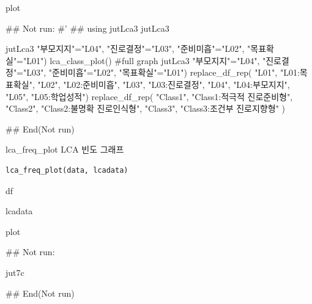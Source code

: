 \documentclass[a4paper]{book}
\begin{document}
%
\begin{Value}
plot
\end{Value}
%
\begin{Examples}
\begin{ExampleCode}
\#\# Not run: 
#'
## using
jutLca3 %
jutLca3 %

jutLca3 %
                         "부모지지"="L04",
                         "진로결정"="L03",
                         "준비미흡"="L02",
                         "목표확실"="L01") %
  lca_class_plot()
#full graph
jutLca3 %
                         "부모지지"="L04",
                         "진로결정"="L03",
                         "준비미흡"="L02",
                         "목표확실"="L01") %
  replace_df_rep(
    "L01", "L01:목표확실",
    "L02", "L02:준비미흡",
    "L03", "L03:진로결정",
    "L04", "L04:부모지지",
    "L05", "L05:학업성적")%
  replace_df_rep(
    "Class1", "Class1:적극적 진로준비형",
    "Class2", "Class2:불명확 진로인식형",
    "Class3", "Class3:조건부 진로지향형"
  )%


## End(Not run)
\end{ExampleCode}
\end{Examples}
%
\begin{Description}
lca\_freq\_plot LCA 빈도 그래프
\end{Description}
%
\begin{Usage}
\begin{verbatim}
lca_freq_plot(data, lcadata)
\end{verbatim}
\end{Usage}
%
\begin{Arguments}
\begin{ldescription}
\item[\code{data}] df

\item[\code{lcadata}] lcadata
\end{ldescription}
\end{Arguments}
%
\begin{Value}
plot
\end{Value}
%
\begin{Examples}
\begin{ExampleCode}
\#\# Not run: 

jut7c %

## End(Not run)
\end{ExampleCode}
\end{Examples}
\end{document}
